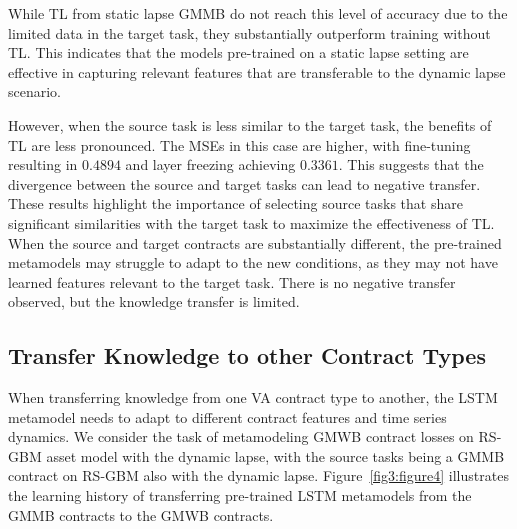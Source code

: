 While TL from static lapse GMMB do not reach this level of accuracy due to the limited data in the target task, they substantially outperform training without TL. 
This indicates that the models pre-trained on a static lapse setting are effective in capturing relevant features that are transferable to the dynamic lapse scenario.

However, when the source task is less similar to the target task, the benefits of TL are less pronounced. The MSEs in this case are higher, with fine-tuning resulting in $0.4894$ and layer freezing achieving $0.3361$. 
This suggests that the divergence between the source and target tasks can lead to negative transfer.
These results highlight the importance of selecting source tasks that share significant similarities with the target task to maximize the effectiveness of TL. 
When the source and target contracts are substantially different, the pre-trained metamodels may struggle to adapt to the new conditions, as they may not have learned features relevant to the target task.
There is no negative transfer observed, but the knowledge transfer is limited.

\subsection{Transfer Knowledge to other Contract Types}

When transferring knowledge from one VA contract type to another, the LSTM metamodel needs to adapt to different contract features and time series dynamics.
We consider the task of metamodeling GMWB contract losses on RS-GBM asset model with the dynamic lapse, with the source tasks being a GMMB contract on RS-GBM also with the dynamic lapse.
Figure~\ref{fig3:figure4} illustrates the learning history of transferring pre-trained LSTM metamodels from the GMMB contracts to the GMWB contracts.


